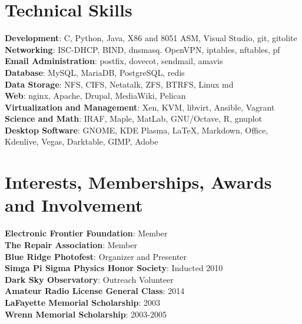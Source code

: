 \documentclass[letterpaper,11pt]{article}
\begin{document}
\section{Technical Skills}
 \begin{itemize}[leftmargin=0.15in, label={}]
    \small{\item{
     \textbf{Development}{: C, Python, Java, X86 and 8051 ASM, Visual Studio, git, gitolite} \\
     \textbf{Networking}{: ISC-DHCP, BIND, dnsmasq. OpenVPN, iptables, nftables, pf} \\
     \textbf{Email Administration}{: postfix, dovecot, sendmail, amavis} \\
     \textbf{Database}{: MySQL, MariaDB, PostgreSQL, redis} \\
     \textbf{Data Storage}{: NFS, CIFS, Netatalk, ZFS, BTRFS, Linux md} \\
     \textbf{Web}{: nginx, Apache, Drupal, MediaWiki, Pelican} \\
     \textbf{Virtualization and Management}{: Xen, KVM, libvirt, Ansible, Vagrant  } \\
     \textbf{Science and Math}{: IRAF, Maple, MatLab, GNU/Octave, R, gnuplot} \\
     \textbf{Desktop Software}{: GNOME, KDE Plasma, \LaTeX, Markdown, Office, Kdenlive, Vegas, Darktable, GIMP, Adobe} 
    }}
 \end{itemize}

\section{Interests, Memberships, Awards and Involvement }
\begin{itemize}[leftmargin=0.15in, label={}]
	\small{\item{
			\textbf{Electronic Frontier Foundation}{:  Member} \\
			\textbf{The Repair Association}{: Member} \\
			\textbf{Blue Ridge Photofest}{: Organizer and Presenter} \\
			\textbf{Simga Pi Sigma Physics Honor Society}{: Inducted 2010} \\
         	\textbf{Dark Sky Observatory}{: Outreach Volunteer} \\
         	\textbf{Amateur Radio License General Class}{: 2014} \\
         	\textbf{LaFayette Memorial Scholarship}{: 2003} \\
         	\textbf{Wrenn Memorial Scholarship}{: 2003-2005} \\
	}}
\end{itemize}


%


\end{document}

